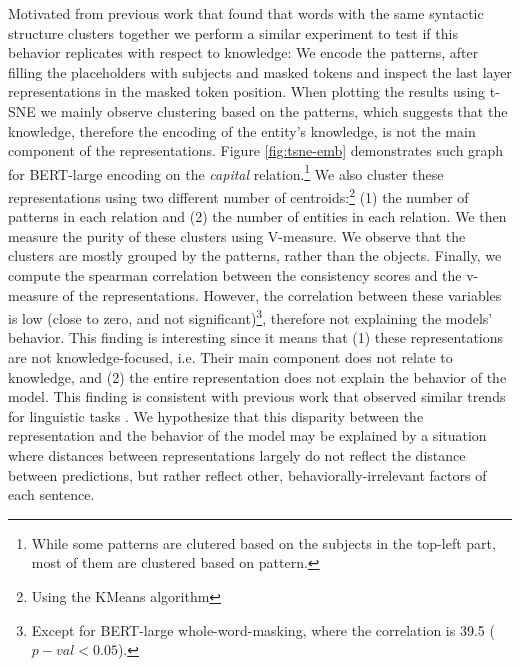 Motivated from previous work that found that words with the same syntactic structure clusters together \cite{chi-etal-2020-finding,ravfogel-etal-2020-unsupervised} we perform a similar experiment to test if this behavior replicates with respect to knowledge:
We encode the patterns, after filling the placeholders with subjects and masked tokens and inspect the last layer representations in the masked token position.
When plotting the results using t-SNE \cite{tsne} we mainly observe clustering based on the patterns, which suggests that the knowledge, therefore the encoding of the entity's knowledge, is not the main component of the representations.
Figure \ref{fig:tsne-emb} demonstrates such graph for BERT-large encoding on the \textit{capital} relation.\footnote{While some patterns are clutered based on the subjects in the top-left part, most of them are clustered based on pattern.}
We also cluster these representations using two different number of centroids:\footnote {Using the KMeans algorithm} (1) the number of patterns in each relation and (2) the number of entities in each relation. We then measure the purity of these clusters using V-measure. We observe that the clusters are mostly grouped by the patterns, rather than the objects.
Finally, we compute the spearman correlation between the consistency scores and the v-measure of the representations.
However, the correlation between these variables is low (close to zero, and not significant)\footnote{Except for BERT-large whole-word-masking, where the correlation is 39.5 ($p-val<0.05$).}, therefore not explaining the models' behavior.
This finding is interesting since it means that (1) these representations are not knowledge-focused, i.e. Their main component does not relate to knowledge, and (2) the entire representation does not explain the behavior of the model. This finding is consistent with previous work that observed similar trends for linguistic tasks \cite{amnesic_probing}.
We hypothesize that this disparity between the representation and the behavior of the model may be explained by a situation where distances between representations largely do not reflect the distance between predictions, but rather reflect other, behaviorally-irrelevant factors of each sentence.


